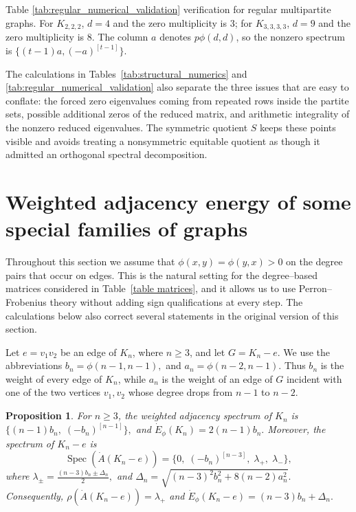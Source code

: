 \documentclass[12pt,twoside]{article}
\newcommand{\spec}{\operatorname{Spec}}
\newtheorem{proposition}[theorem]{Proposition}
\begin{document}
Table \ref{tab:regular_numerical_validation} verification for regular multipartite graphs. For $K_{2,2,2}$, $d=4$ and the zero multiplicity is $3$; for $K_{3,3,3,3}$, $d=9$ and the zero multiplicity is $8$. The column $a$ denotes $p\phi(d,d)$, so the nonzero spectrum is $\{(t-1)a,(-a)^{[t-1]}\}$.

The calculations in Tables~\ref{tab:structural_numerics} and \ref{tab:regular_numerical_validation} also separate the three issues that are easy to conflate: the forced zero eigenvalues coming from repeated rows inside the partite sets, possible additional zeros of the reduced matrix, and arithmetic integrality of the nonzero reduced eigenvalues. The symmetric quotient $S$ keeps these points visible and avoids treating a nonsymmetric equitable quotient as though it admitted an orthogonal spectral decomposition.




\section{Weighted adjacency energy of some special families of graphs}\label{section 3}

Throughout this section we assume that $\phi(x,y)=\phi(y,x)>0$ on the degree pairs that occur on edges. This is the natural setting for the degree--based matrices considered in Table~\ref{table matrices}, and it allows us to use Perron--Frobenius theory without adding sign qualifications at every step. The calculations below also correct several statements in the original version of this section. 

\medskip

Let $e=v_1v_2$ be an edge of $K_n$, where $n\geq 3$, and let $G=K_n-e$. We use the abbreviations
$
b_n=\phi(n-1,n-1),$ and $a_n=\phi(n-2,n-1).
$
Thus $b_n$ is the weight of every edge of $K_n$, while $a_n$ is the weight of an edge of $G$ incident with one of the two vertices $v_1,v_2$ whose degree drops from $n-1$ to $n-2$.

\begin{proposition}\label{thm:Kn-minus-edge-exact}
	For $n\geq 3$, the weighted adjacency spectrum of $K_n$ is
	$ \Big\{(n-1)b_n,\;(-b_n)^{[n-1]}\Big\}, $
	and
	$
	\dot E_\phi(K_n)=2(n-1)b_n.
	$
	Moreover, the spectrum of $K_n-e$ is
	$$
	\spec(\dot A(K_n-e))
	=
	\Big\{0,\;(-b_n)^{[n-3]},\;\lambda_+,\;\lambda_-\Big\},
	$$
	where
	$
	\lambda_{\pm}
	=
	\tfrac{(n-3)b_n\pm\Delta_n}{2},
	$ and $
	\Delta_n=
	\sqrt{(n-3)^2b_n^2+8(n-2)a_n^2}.
	$
	Consequently,
	$
	\rho(\dot A(K_n-e))=\lambda_+
	$
	and
	$
	\dot E_\phi(K_n-e)=(n-3)b_n+\Delta_n.
	$
\end{proposition}
\end{document}

